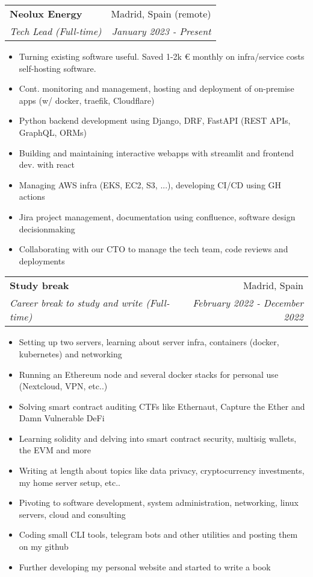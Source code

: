 \documentclass[a4paper,20pt]{article}
\makeatletter
\newcommand{\resumeSubheading}[4]{
  \vspace{-1pt}\item
    \begin{tabular*}{0.97\textwidth}{l@{\extracolsep{\fill}}r}
      \textbf{#1} & #2 \\
      \textit{#3} & \textit{#4} \\
    \end{tabular*}\vspace{-5pt}
}
\makeatother
\begin{document}
  \resumeSubheading{Neolux Energy}{Madrid, Spain (remote)}
    {Tech Lead (Full-time)}{January 2023 - Present}
\begin{itemize} \itemsep-0.24em
  \item Turning existing software useful. Saved 1-2k € monthly on infra/service costs self-hosting software.
  \item Cont. monitoring and management, hosting and deployment of on-premise apps (w/ docker, traefik, Cloudflare)
  \item Python backend development using Django, DRF, FastAPI (REST APIs, GraphQL, ORMs)
  \item Building and maintaining interactive webapps with streamlit and frontend dev. with react
  \item Managing AWS infra (EKS, EC2, S3, ...), developing CI/CD using GH actions
  \item Jira project management, documentation using confluence, software design decisionmaking
  \item Collaborating with our CTO to manage the tech team, code reviews and deployments
\end{itemize}
\vspace{-2pt}
  \resumeSubheading{Study break}{Madrid, Spain}
    {Career break to study and write (Full-time)}{February 2022 - December 2022}
\begin{itemize} \itemsep-0.24em
  \item Setting up two servers, learning about server infra, containers (docker, kubernetes) and networking
  \item Running an Ethereum node and several docker stacks for personal use (Nextcloud, VPN, etc..)
  \item Solving smart contract auditing CTFs like Ethernaut, Capture the Ether and Damn Vulnerable DeFi
  \item Learning solidity and delving into smart contract security, multisig wallets, the EVM and more
  \item Writing at length about topics like data privacy, cryptocurrency investments, my home server setup, etc..
  \item Pivoting to software development, system administration, networking, linux servers, cloud and consulting
  \item Coding small CLI tools, telegram bots and other utilities and posting them on my github
  \item Further developing my personal website and started to write a book
\end{itemize}
\end{document}
